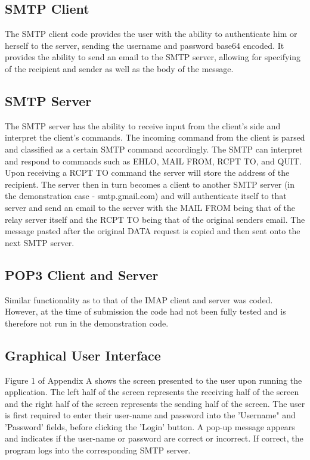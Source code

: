 \documentclass[11pt]{article}
\begin{document}
\begin{multicols}{2}
\subsection{SMTP Client}
The SMTP client code provides the user with the ability to authenticate him or herself to the server, sending the username and password base64 encoded. It provides the ability to send an email to the SMTP server, allowing for specifying of the recipient and sender as well as the body of the message.
\subsection{SMTP Server}
The SMTP server has the ability to receive input from the client's side and interpret the client's commands. The incoming command from the client is parsed and classified as a certain SMTP command accordingly. The SMTP can interpret and respond to commands such as EHLO, MAIL FROM, RCPT TO, and QUIT. Upon receiving a RCPT TO command the server will store the address of the recipient. The server then in turn becomes a client to another SMTP server (in the demonstration case - smtp.gmail.com) and will authenticate itself to that server and send an email to the server with the MAIL FROM being that of the relay server itself and the RCPT TO being that of the original senders email. The message pasted after the original DATA request is copied and then sent onto the next SMTP server.
\subsection{POP3 Client and Server}
Similar functionality as to that of the IMAP client and server was coded. However, at the time of submission the code had not been fully tested and is therefore not run in the demonstration code.
\subsection{Graphical User Interface}
Figure 1 of Appendix A shows the screen presented to the user upon running the application. The left half of the screen represents the receiving half of the screen and the right half of the screen represents the sending half of the screen. The user is first required to enter their user-name and password into the 'Username" and 'Password' fields, before clicking the 'Login' button. A pop-up message appears and indicates if the user-name or password are correct or incorrect. If correct, the program logs into the corresponding SMTP server.

\end{multicols}
\end{document}
